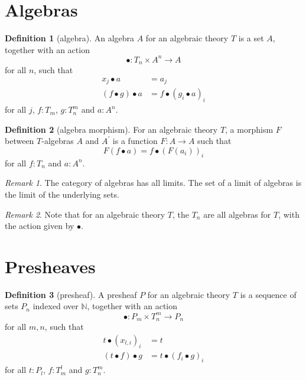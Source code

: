 \documentclass[a4paper]{amsbook}
\theoremstyle{definition}
\newtheorem{definition}{Definition}
\theoremstyle{remark}
\newtheorem{remark}{Remark}
\begin{document}
  \section{Algebras}

  \begin{definition}[algebra]
    An algebra $ A $ for an algebraic theory $ T $ is a set $ A $, together with an action
    \[ \bullet: T_n \times A^n \to A \]
    for all $ n $, such that
    \begin{align*}
      x_j \bullet a &= a_j\\
      (f \bullet g) \bullet a &= f \bullet (g_i \bullet a)_i
    \end{align*}
    for all $ j $, $ f: T_m $, $ g: T_n^m $ and $ a: A^n $.
  \end{definition}

  \begin{definition}[algebra morphism]
    For an algebraic theory $ T $, a morphism $ F $ between $ T $-algebras $ A $ and $ A^\prime $ is a function $ F: A \to A $ such that
    \[ F(f \bullet a) = f \bullet (F(a_i))_i \]
    for all $ f: T_n $ and $ a: A^n $.
  \end{definition}

  \begin{remark}
    The category of algebras has all limits. The set of a limit of algebras is the limit of the underlying sets.
  \end{remark}

  \begin{remark}
    Note that for an algebraic theory $ T $, the $ T_n $ are all algebras for $ T $, with the action given by $ \bullet $.
  \end{remark}

  \section{Presheaves}

  \begin{definition}[presheaf]
    A presheaf $ P $ for an algebraic theory $ T $ is a sequence of sets $ P_n $ indexed over $ \mathbb N $, together with an action
    \[ \bullet: P_m \times T_n^m \to P_n \]
    for all $ m, n $, such that
    \begin{align*}
      t \bullet (x_{l, i})_i &= t\\
      (t \bullet f) \bullet g &= t \bullet (f_i \bullet g)_i
    \end{align*}
    for all $ t: P_l $, $ f: T_m^l $ and $ g: T_n^m $.
  \end{definition}
\end{document}
